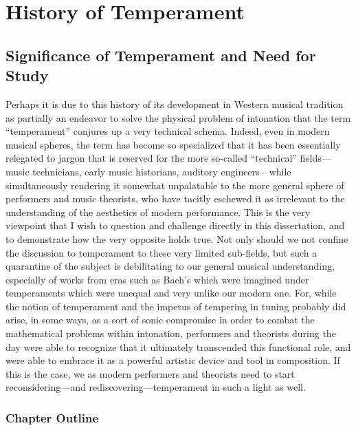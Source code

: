     
    
    
    

    \hypertarget{History of Temperament}{\chapter{History of Temperament}\label{History of Temperament}}
    \section{Significance of Temperament and Need for
Study}\label{significance-of-temperament-and-need-for-study}

Perhaps it is due to this history of its development in Western musical
tradition as partially an endeavor to solve the physical problem of
intonation that the term ``temperament'' conjures up a very technical
schema. Indeed, even in modern musical spheres, the term has become so
specialized that it has been essentially relegated to jargon that is
reserved for the more so-called ``technical'' fields---music
technicians, early music historians, auditory engineers---while
simultaneously rendering it somewhat unpalatable to the more general
sphere of performers and music theorists, who have tacitly eschewed it
as irrelevant to the understanding of the aesthetics of modern
performance. This is the very viewpoint that I wish to question and
challenge directly in this dissertation, and to demonstrate how the very
opposite holds true. Not only should we not confine the discussion to
temperament to these very limited sub-fields, but such a quarantine of
the subject is debilitating to our general musical understanding,
especially of works from eras such as Bach's which were imagined under
temperaments which were unequal and very unlike our modern one. For,
while the notion of temperament and the impetus of tempering in tuning
probably did arise, in some ways, as a sort of sonic compromise in order
to combat the mathematical problems within intonation, performers and
theorists during the day were able to recognize that it ultimately
transcended this functional role, and were able to embrace it as a
powerful artistic device and tool in composition. If this is the case,
we as modern performers and theorists need to start reconsidering---and
rediscovering---temperament in such a light as well.

\subsection{Chapter Outline}\label{chapter-outline}

